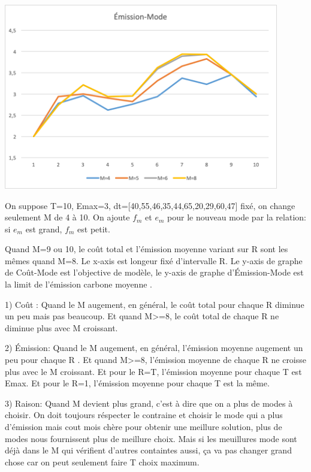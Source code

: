 \documentclass[12pt,a4paper]{article}
\begin{document}
\begin{minipage}[r]{.99\linewidth}
	\center\includegraphics[width=12cm]{img/change/mode-emission.png}
	\begin{center}
	\end{center}
\end{minipage}
\begin{justify}
On suppose T=10, Emax=3, dt=[40,55,46,35,44,65,20,29,60,47] fixé, on change seulement M de 4 à 10. On ajoute $f_m$ et $e_m$ pour le nouveau mode par la relation: si $e_m$ est grand, $f_m$ est petit. 
\end{justify}
\begin{justify}
Quand M=9 ou 10, le coût total et l'émission moyenne variant sur R sont les mêmes quand M=8. Le x-axis est longeur fixé d'intervalle R. Le y-axis de graphe de Coût-Mode est l'objective de modèle, le y-axis de graphe d'Émission-Mode est la limit de l'émission carbone moyenne .
\end{justify}
\begin{justify}

1) Coût : Quand le M augement, en général, le coût total pour chaque R diminue un peu mais pas beaucoup. Et quand M>=8, le coût total de chaque R ne diminue plus avec M croissant. 
\end{justify}
\begin{justify}
2) Émission: Quand le M augement, en général, l'émission moyenne augement un peu pour chaque R . Et quand M>=8, l'émission moyenne  de chaque R ne croisse plus avec le M croissant. Et pour le R=T,  l'émission moyenne pour chaque T est Emax. Et pour le R=1,  l'émission moyenne pour chaque T est la même.
\end{justify}
\begin{justify}
3) Raison: Quand M devient plus grand, c'est à dire que on a plus de modes à choisir. On doit toujours réspecter le contraine et choisir le mode qui a plus d'émission mais cout mois chère pour obtenir une meillure solution, plus de modes nous fournissent plus de meillure choix. Mais si les meuillures mode sont déjà dans le M qui vérifient d'autres containtes aussi, ça va pas changer grand chose car on peut seulement faire T choix maximum.
\end{justify}
\newpage
\end{document}
